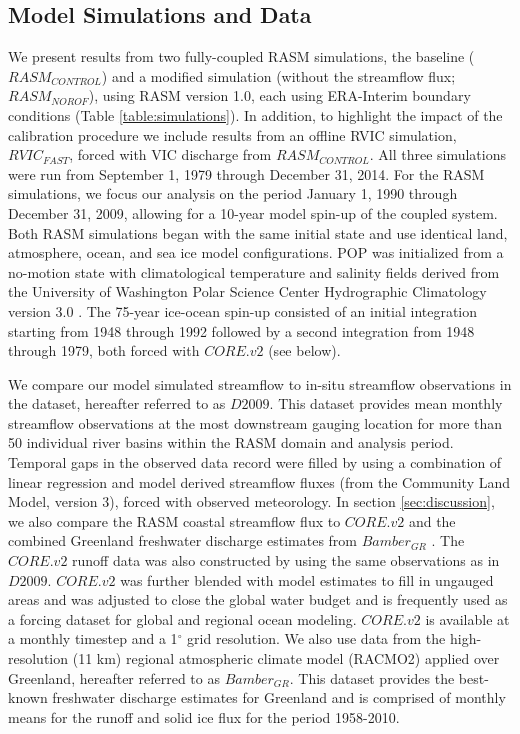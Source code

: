 \documentclass[jgrga, draft]{agutex}
\begin{document}
\begin{article}
\section{Model Simulations and Data}
\label{sec:data}

We present results from two fully-coupled RASM simulations, the baseline ($RASM_{CONTROL}$) and a modified simulation (without the streamflow flux; $RASM_{NOROF}$), using RASM version 1.0, each using ERA-Interim boundary conditions (Table \ref{table:simulations}).
In addition, to highlight the impact of the calibration procedure we include results from an offline RVIC simulation, $RVIC_{FAST}$, forced with VIC discharge from $RASM_{CONTROL}$.
All three simulations were run from September 1, 1979 through December 31, 2014.
For the RASM simulations, we focus our analysis on the period January 1, 1990 through December 31, 2009, allowing for a 10-year model spin-up of the coupled system.
Both RASM simulations began with the same initial state \citep[see ][]{Hamman_2016} and use identical land, atmosphere, ocean, and sea ice model configurations.
POP was initialized from a no-motion state with climatological temperature and salinity fields derived from the University of Washington Polar Science Center Hydrographic Climatology version 3.0 \citep{Steele_2001}.
The 75-year ice-ocean spin-up consisted of an initial integration starting from 1948 through 1992 followed by a second integration from 1948 through 1979, both forced with $CORE.v2$ (see below).

We compare our model simulated streamflow to in-situ streamflow observations in the \citet{Dai_2009} dataset, hereafter referred to as $D2009$.
This dataset provides mean monthly streamflow observations at the most downstream gauging location for more than 50 individual river basins within the RASM domain and analysis period.
Temporal gaps in the observed data record were filled by \citet{Dai_2009} using a combination of linear regression and model derived streamflow fluxes (from the Community Land Model, version 3), forced with observed meteorology.
In section \ref{sec:discussion}, we also compare the RASM coastal streamflow flux to $CORE.v2$ \citep{Large_2009} and the combined Greenland freshwater discharge estimates from $Bamber_{GR}$ \citep{Bamber_2012}.
The $CORE.v2$ runoff data was also constructed by \citet{Dai_2009} using the same observations as in $D2009$.
$CORE.v2$ was further blended with model estimates to fill in ungauged areas and was adjusted to close the global water budget and is frequently used as a forcing dataset for global and regional ocean modeling.
$CORE.v2$ is available at a monthly timestep and a 1$^{\circ}$ grid resolution.
We also use data from the high-resolution (11 km) regional atmospheric climate model (RACMO2) applied over Greenland, hereafter referred to as $Bamber_{GR}$.
This dataset provides the best-known freshwater discharge estimates for Greenland and is comprised of monthly means for the runoff and solid ice flux for the period 1958-2010.


\end{article}
\end{document}
